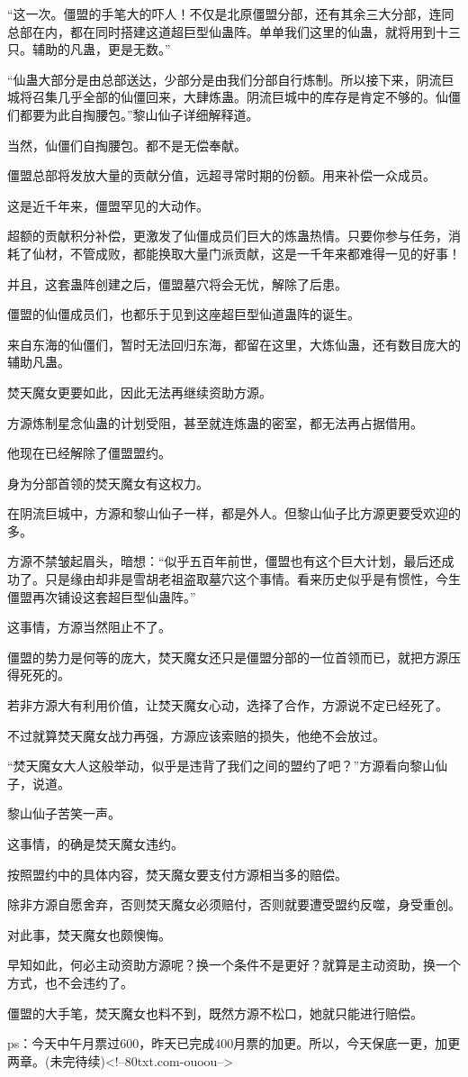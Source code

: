 \begin{this_body}
“这一次。僵盟的手笔大的吓人！不仅是北原僵盟分部，还有其余三大分部，连同总部在内，都在同时搭建这道超巨型仙蛊阵。单单我们这里的仙蛊，就将用到十三只。辅助的凡蛊，更是无数。”

“仙蛊大部分是由总部送达，少部分是由我们分部自行炼制。所以接下来，阴流巨城将召集几乎全部的仙僵回来，大肆炼蛊。阴流巨城中的库存是肯定不够的。仙僵们都要为此自掏腰包。”黎山仙子详细解释道。

当然，仙僵们自掏腰包。都不是无偿奉献。

僵盟总部将发放大量的贡献分值，远超寻常时期的份额。用来补偿一众成员。

这是近千年来，僵盟罕见的大动作。

超额的贡献积分补偿，更激发了仙僵成员们巨大的炼蛊热情。只要你参与任务，消耗了仙材，不管成败，都能换取大量门派贡献，这是一千年来都难得一见的好事！

并且，这套蛊阵创建之后，僵盟墓穴将会无忧，解除了后患。

僵盟的仙僵成员们，也都乐于见到这座超巨型仙道蛊阵的诞生。

来自东海的仙僵们，暂时无法回归东海，都留在这里，大炼仙蛊，还有数目庞大的辅助凡蛊。

焚天魔女更要如此，因此无法再继续资助方源。

方源炼制星念仙蛊的计划受阻，甚至就连炼蛊的密室，都无法再占据借用。

他现在已经解除了僵盟盟约。

身为分部首领的焚天魔女有这权力。

在阴流巨城中，方源和黎山仙子一样，都是外人。但黎山仙子比方源更要受欢迎的多。

方源不禁皱起眉头，暗想：“似乎五百年前世，僵盟也有这个巨大计划，最后还成功了。只是缘由却非是雪胡老祖盗取墓穴这个事情。看来历史似乎是有惯性，今生僵盟再次铺设这套超巨型仙蛊阵。”

这事情，方源当然阻止不了。

僵盟的势力是何等的庞大，焚天魔女还只是僵盟分部的一位首领而已，就把方源压得死死的。

若非方源大有利用价值，让焚天魔女心动，选择了合作，方源说不定已经死了。

不过就算焚天魔女战力再强，方源应该索赔的损失，他绝不会放过。

“焚天魔女大人这般举动，似乎是违背了我们之间的盟约了吧？”方源看向黎山仙子，说道。

黎山仙子苦笑一声。

这事情，的确是焚天魔女违约。

按照盟约中的具体内容，焚天魔女要支付方源相当多的赔偿。

除非方源自愿舍弃，否则焚天魔女必须赔付，否则就要遭受盟约反噬，身受重创。

对此事，焚天魔女也颇懊悔。

早知如此，何必主动资助方源呢？换一个条件不是更好？就算是主动资助，换一个方式，也不会违约了。

僵盟的大手笔，焚天魔女也料不到，既然方源不松口，她就只能进行赔偿。

ps：今天中午月票过600，昨天已完成400月票的加更。所以，今天保底一更，加更两章。(未完待续)<!--80txt.com-ouoou-->

\end{this_body}

